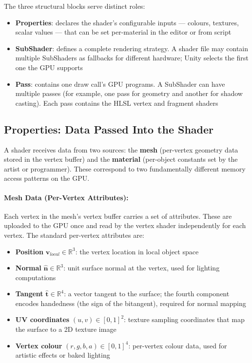 \documentclass[11pt]{article}
\begin{document}
The three structural blocks serve distinct roles:

\begin{itemize}
    \item \textbf{Properties}: declares the shader's configurable inputs --- colours, textures, scalar values --- that can be set per-material in the editor or from script
    \item \textbf{SubShader}: defines a complete rendering strategy. A shader file may contain multiple SubShaders as fallbacks for different hardware; Unity selects the first one the GPU supports
    \item \textbf{Pass}: contains one draw call's GPU programs. A SubShader can have multiple passes (for example, one pass for geometry and another for shadow casting). Each pass contains the HLSL vertex and fragment shaders
\end{itemize}


\subsection{Properties: Data Passed Into the Shader}

A shader receives data from two sources: the \textbf{mesh} (per-vertex geometry data stored in the vertex buffer) and the \textbf{material} (per-object constants set by the artist or programmer). These correspond to two fundamentally different memory access patterns on the GPU.

\paragraph{Mesh Data (Per-Vertex Attributes):}

Each vertex in the mesh's vertex buffer carries a set of attributes. These are uploaded to the GPU once and read by the vertex shader independently for each vertex. The standard per-vertex attributes are:

\begin{itemize}
    \item \textbf{Position} $\mathbf{v}_{local} \in \mathbb{R}^3$: the vertex location in local object space
    \item \textbf{Normal} $\hat{\mathbf{n}} \in \mathbb{R}^3$: unit surface normal at the vertex, used for lighting computations
    \item \textbf{Tangent} $\hat{\mathbf{t}} \in \mathbb{R}^4$: a vector tangent to the surface; the fourth component encodes handedness (the sign of the bitangent), required for normal mapping
    \item \textbf{UV coordinates} $(u, v) \in [0,1]^2$: texture sampling coordinates that map the surface to a 2D texture image
    \item \textbf{Vertex colour} $(r, g, b, a) \in [0,1]^4$: per-vertex colour data, used for artistic effects or baked lighting
\end{itemize}
\end{document}
